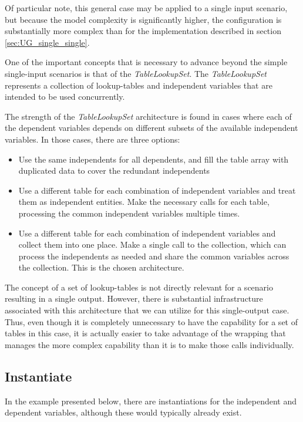\documentclass[11pt,fleqn]{report}
\begin{document}
Of particular note, this general case may be applied to a single input
scenario, but because the model complexity is significantly higher, the
 configuration is substantially more complex than for the implementation
 described in section \ref{sec:UG_single_single}.

One of the important concepts that is necessary to advance beyond the simple
 single-input scenarios is that of the \textit{TableLookupSet}.  The
\textit{TableLookupSet} represents a collection of lookup-tables and
 independent variables that are intended to be used concurrently.

The strength of the \textit{TableLookupSet} architecture is found in cases
where each of the dependent variables depends on different subsets of the
available  independent variables.  In those cases, there are three options:
\begin{itemize}
 \item Use the same independents for all dependents, and fill the table array
 with duplicated data to cover the redundant independents
 \item Use a different table for each combination of independent variables
 and treat them as independent entities.  Make the necessary calls
 for each table, processing the common independent variables multiple times.
 \item Use a different table for each combination of independent variables
 and collect them into one place.  Make a single call to the collection, which
 can process the independents as needed and share the common variables across
 the collection.  This is the chosen architecture.
\end{itemize}

The concept of a set of lookup-tables is not directly relevant for a
scenario resulting in a single output.  However,
there is substantial infrastructure associated with this architecture that
we can utilize for this single-output case.
Thus, even though it is completely unnecessary
to have the capability for a set of tables in this case, it is actually easier
to take advantage of the wrapping that manages the more complex capability
than it is to make those calls individually.


\subsection{Instantiate}
In the example presented below, there are instantiations for the independent
 and dependent variables,
although these would typically already exist.
\end{document}
